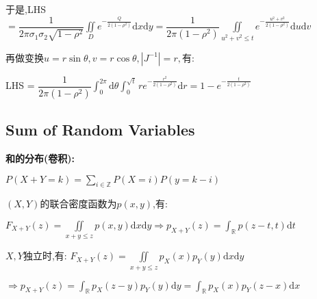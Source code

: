 \begin{enumerate}
    于是,LHS$ =\dfrac{1}{2\pi\sigma_1\sigma_2\sqrt{1-\rho^2}}\iint\limits_{D}e^{-\frac{Q}{2(1-\rho^2)}}\mathrm{d}x\mathrm{d}y = \dfrac{1}{2\pi(1-\rho^2)}\iint\limits_{u^2+v^2\le t}e^{-\frac{u^2+v^2}{2(1-\rho^2)}}\mathrm{d}u\mathrm{d}v$

    再做变换$ u = r\sin\theta, v=r\cos\theta, |J^{-1}| = r,有:$

    LHS = $\dfrac{1}{2\pi(1-\rho^2)}\int_{0}^{2\pi}{\mathrm{d}\theta}\int_{0}^{\sqrt{t}}{re^{-\frac{r^2}{2(1-\rho^2)}}\mathrm{d}r}  = 1-e^{-\frac{t}{2(1-\rho^2)}}$

\end{enumerate}

\subsection{Sum of Random Variables}
\textbf{和的分布(卷积):}

$P(X+Y=k) = \sum_{i\in \mathbb{Z}}{P(X=i)P(y=k-i)}$

$(X,Y)$的联合密度函数为$ p(x,y)$,有:

$F_{X+Y}(z) = \iint\limits_{x+y\le z}p(x,y)\mathrm{d}x\mathrm{d}y \Rightarrow p_{X+Y}(z)=\int_{\mathbb{R}}p(z-t,t)\mathrm{d}t$

$X,Y$独立时,有: $F_{X+Y}(z) = \iint\limits_{x+y\le z}p_X(x)p_Y(y)\mathrm{d}x\mathrm{d}y $

$\Rightarrow p_{X+Y}(z)= \int_{\mathbb{R}}p_X(z-y)p_Y(y)\mathrm{d}y=\int_{\mathbb{R}}{p_X(x)p_Y(z-x)\mathrm{d}x}$

